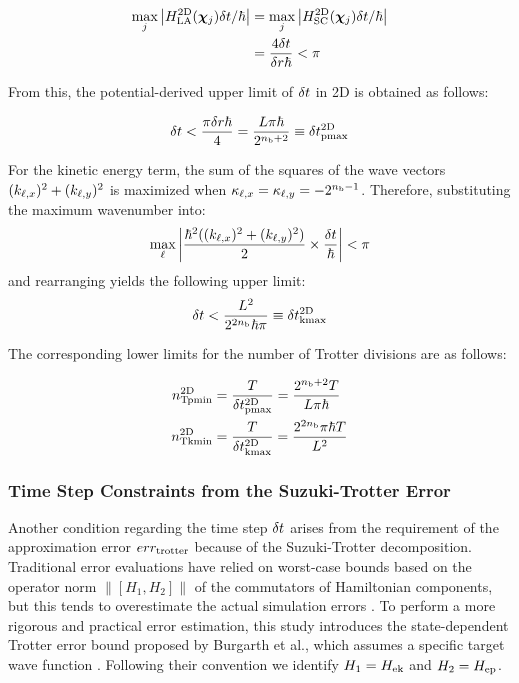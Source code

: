 \documentclass[aip-draft.tex]{subfiles}
\begin{document}
\begin{align}
\max_{j}{\left| H_{\mathrm{LA}}^{\mathrm{2D}}(\bm{\chi}_{j})\delta t/\hbar \right|}
  &= \max_{j}{\left| H_{\mathrm{SC}}^{\mathrm{2D}}(\bm{\chi}_{j})\delta t/\hbar \right|}\\
  &= \frac{4\delta t}{\delta r\hbar} < \pi
\end{align}

From this, the potential-derived upper limit of $\delta t$ in 2D is obtained as
follows:

\begin{equation}
\delta t < \frac{\pi\delta r\hbar}{4}
        =\frac{L\pi\hbar}{2^{n_{\mathrm{b}}+2}}
        \equiv\delta t_{\mathrm{pmax}}^{\mathrm{2D}}
 \label{eq:nyqist-limit-by-hep-final-2D}
\end{equation}

For the kinetic energy term, the sum of the squares of the wave vectors
$(k_{\ell,x})^2+(k_{\ell,y})^2$ is maximized when $\kappa_{\ell,x}=\kappa_{\ell,y}=-2^{n_{\mathrm{b}}-1}$. Therefore,
substituting the maximum wavenumber into:
\begin{equation}
\max_{\ell}{\left| \frac{\hbar^2((k_{\ell,x})^2+(k_{\ell,y})^2)}{2}\times\frac{\delta t}{\hbar} \right|} < \pi
\end{equation}
and rearranging yields the following upper limit:
\begin{equation}
\delta t < \frac{L^2}{2^{2n_{\mathrm{b}}}\hbar\pi} \equiv\delta t_{\mathrm{kmax}}^{\mathrm{2D}}
 \label{eq:nyqist-limit-by-hek-final-2D}
\end{equation}

The corresponding lower limits for the number of Trotter divisions are as follows:

\begin{align}
    n_{\mathrm{Tpmin}}^{\mathrm{2D}} &= \frac{T}{\delta t_{\mathrm{pmax}}^{\mathrm{2D}}}=\frac{2^{n_{\mathrm{b}}+2}T}{L\pi\hbar} \\
    n_{\mathrm{Tkmin}}^{\mathrm{2D}} &= \frac{T}{\delta t_{\mathrm{kmax}}^{\mathrm{2D}}}=\frac{2^{2n_{\mathrm{b}}}\pi\hbar T}{L^2}
\end{align}

\subsubsection{Time Step Constraints from the Suzuki-Trotter Error}
\label{subsubsec:time-step-constraints-from-suzuki-trotter-error}

Another condition regarding the time step $\delta t$ arises from the requirement
of the approximation error $err_{\mathrm{trotter}}$ because of the Suzuki-Trotter
decomposition. Traditional error evaluations have relied on worst-case bounds
based on the operator norm $\| [H_1,H_2] \|$ of the commutators of Hamiltonian
components, but this tends to overestimate the actual simulation errors
\cite{Childs2021.PhysRevX.11.011020}. To perform a more rigorous and practical
error estimation, this study introduces the state-dependent Trotter error bound
proposed by Burgarth et al., which assumes a specific target wave function
\cite{Burgarth2024.PhysRevResearch.6.043155}.  Following their convention we
identify $H_1=H_{\mathrm{ek}}$ and $H_2=H_{\mathrm{ep}}$.
\end{document}
